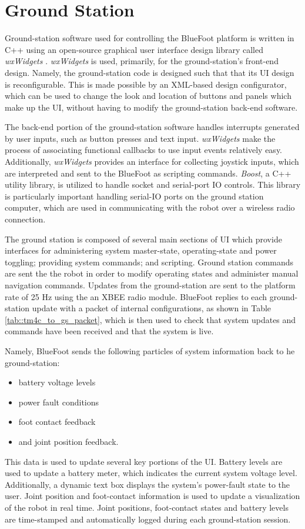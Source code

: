 	\section{Ground Station}
		
		Ground-station software used for controlling the BlueFoot platform is written in C++ using an open-source graphical user interface design library called \emph{wxWidgets} \cite{WX_Website}. \emph{wxWidgets} is used, primarily, for the ground-station's front-end design. Namely, the ground-station code is designed such that that its UI design is reconfigurable. This is made possible by an XML-based design configurator, which can be used to change the look and location of buttons and panels which make up the UI, without having to modify the ground-station back-end software. 

		The back-end portion of the ground-station software handles interrupts generated by user inputs, such as button presses and text input. \emph{wxWidgets} make the process of associating functional callbacks to use input events relatively easy. Additionally, \emph{wxWidgets} provides an interface for collecting joystick inputs, which are interpreted and sent to the BlueFoot as scripting commands. \emph{Boost}, a C++ utility library, is utilized to handle socket and serial-port IO controls. This library is particularly important handling serial-IO ports on the ground station computer, which are used in communicating with the robot over a wireless radio connection.

		The ground station is composed of several main sections of UI which provide interfaces for administering system master-state, operating-state and power toggling; providing system commands; and scripting. Ground station commands are sent the the robot in order to modify operating states and administer manual navigation commands. Updates from the ground-station are sent to the platform rate of 25 Hz using the an XBEE radio module. BlueFoot replies to each ground-station update with a packet of internal configurations, as shown in Table \ref{tab::tm4c_to_gs_packet}, which is then used to check that system updates and commands have been received and that the system is live.

		Namely, BlueFoot sends the following particles of system information back to he ground-station: 
		\begin{itemize}
			\item battery voltage levels 
			\item power fault conditions 
			\item foot contact feedback
			\item and joint position feedback. 
		\end{itemize}
		This data is used to update several key portions of the UI. Battery levels are used to update a battery meter, which indicates the current system voltage level. Additionally, a dynamic text box displays the system's power-fault state to the user. Joint position and foot-contact information is used to update a visualization of the robot in real time. Joint positions, foot-contact states and battery levels are time-stamped and automatically logged during each ground-station session. 

